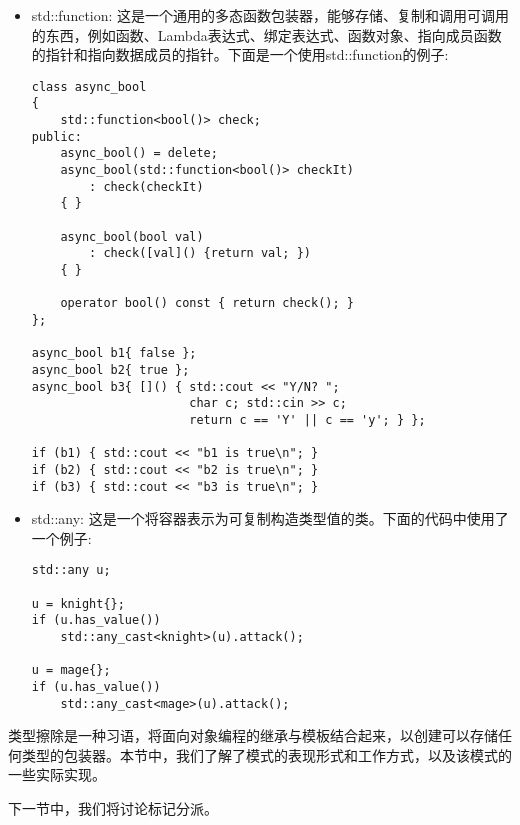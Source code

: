 \begin{itemize}
\item
std::function: 这是一个通用的多态函数包装器，能够存储、复制和调用可调用的东西，例如函数、Lambda表达式、绑定表达式、函数对象、指向成员函数的指针和指向数据成员的指针。下面是一个使用std::function的例子:

\begin{lstlisting}[style=styleCXX]
class async_bool
{
	std::function<bool()> check;
public:
	async_bool() = delete;
	async_bool(std::function<bool()> checkIt)
		: check(checkIt)
	{ }
	
	async_bool(bool val)
		: check([val]() {return val; })
	{ }
	
	operator bool() const { return check(); }
};

async_bool b1{ false };
async_bool b2{ true };
async_bool b3{ []() { std::cout << "Y/N? ";
					  char c; std::cin >> c;
					  return c == 'Y' || c == 'y'; } };
				  
if (b1) { std::cout << "b1 is true\n"; }
if (b2) { std::cout << "b2 is true\n"; }
if (b3) { std::cout << "b3 is true\n"; }
\end{lstlisting}

\item
std::any: 这是一个将容器表示为可复制构造类型值的类。下面的代码中使用了一个例子:

\begin{lstlisting}[style=styleCXX]
std::any u;

u = knight{};
if (u.has_value())
	std::any_cast<knight>(u).attack();

u = mage{};
if (u.has_value())
	std::any_cast<mage>(u).attack();
\end{lstlisting}
\end{itemize}

类型擦除是一种习语，将面向对象编程的继承与模板结合起来，以创建可以存储任何类型的包装器。本节中，我们了解了模式的表现形式和工作方式，以及该模式的一些实际实现。

下一节中，我们将讨论标记分派。



